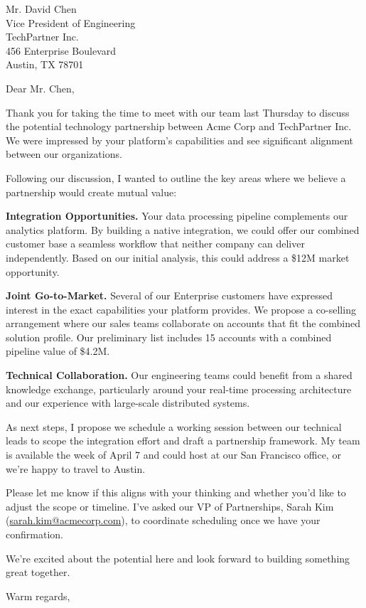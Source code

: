 \documentclass[11pt,a4paper]{letter}
\date{\today}
\begin{document}
\begin{letter}{
    Mr. David Chen\\
    Vice President of Engineering\\
    TechPartner Inc.\\
    456 Enterprise Boulevard\\
    Austin, TX 78701
}

\opening{Dear Mr. Chen,}

Thank you for taking the time to meet with our team last Thursday to discuss the potential technology partnership between Acme Corp and TechPartner Inc. We were impressed by your platform's capabilities and see significant alignment between our organizations.

Following our discussion, I wanted to outline the key areas where we believe a partnership would create mutual value:

\textbf{Integration Opportunities.} Your data processing pipeline complements our analytics platform. By building a native integration, we could offer our combined customer base a seamless workflow that neither company can deliver independently. Based on our initial analysis, this could address a \$12M market opportunity.

\textbf{Joint Go-to-Market.} Several of our Enterprise customers have expressed interest in the exact capabilities your platform provides. We propose a co-selling arrangement where our sales teams collaborate on accounts that fit the combined solution profile. Our preliminary list includes 15 accounts with a combined pipeline value of \$4.2M.

\textbf{Technical Collaboration.} Our engineering teams could benefit from a shared knowledge exchange, particularly around your real-time processing architecture and our experience with large-scale distributed systems.

As next steps, I propose we schedule a working session between our technical leads to scope the integration effort and draft a partnership framework. My team is available the week of April 7 and could host at our San Francisco office, or we're happy to travel to Austin.

Please let me know if this aligns with your thinking and whether you'd like to adjust the scope or timeline. I've asked our VP of Partnerships, Sarah Kim (\href{mailto:sarah.kim@acmecorp.com}{sarah.kim@acmecorp.com}), to coordinate scheduling once we have your confirmation.

We're excited about the potential here and look forward to building something great together.

\closing{Warm regards,}


\end{letter}
\end{document}
